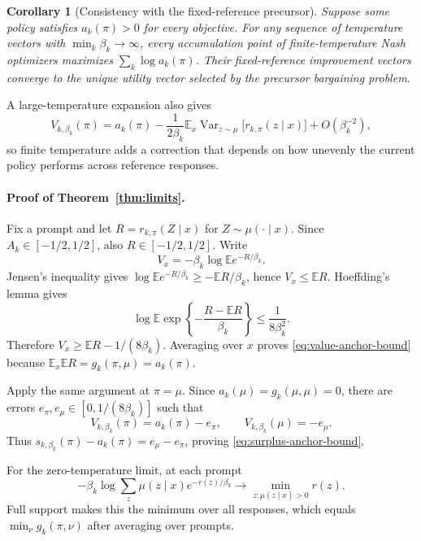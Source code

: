 \documentclass{article}
\newtheorem{corollary}{Corollary}
\theoremstyle{remark}
\theoremstyle{plain}
\newcommand{\E}{\mathbb{E}}
\begin{document}
\begin{corollary}[Consistency with the fixed-reference precursor]
\label{cor:anchor-consistency}
Suppose some policy satisfies $a_k(\pi)>0$ for every objective. For any sequence of temperature vectors with $\min_k\beta_k\to\infty$, every accumulation point of finite-temperature Nash optimizers maximizes $\sum_k\log a_k(\pi)$. Their fixed-reference improvement vectors converge to the unique utility vector selected by the precursor bargaining problem.
\end{corollary}

A large-temperature expansion also gives
\begin{equation}
V_{k,\beta_k}(\pi)
=a_k(\pi)-\frac{1}{2\beta_k}\E_x\operatorname{Var}_{z\sim\mu}
\big[r_{k,\pi}(z\mid x)\big]+O(\beta_k^{-2}),
\label{eq:large-beta-expansion}
\end{equation}
so finite temperature adds a correction that depends on how unevenly the current policy performs across reference responses.

\paragraph{Proof of Theorem~\ref{thm:limits}.}

Fix a prompt and let $R=r_{k,\pi}(Z\mid x)$ for $Z\sim\mu(\cdot\mid x)$. Since $A_k\in[-1/2,1/2]$, also $R\in[-1/2,1/2]$. Write
\[
V_x=-\beta_k\log\E e^{-R/\beta_k}.
\]
Jensen's inequality gives
$\log\E e^{-R/\beta_k}\ge-\E R/\beta_k$, hence $V_x\le\E R$.
Hoeffding's lemma gives
\[
\log\E\exp\left\{-\frac{R-\E R}{\beta_k}\right\}
\le\frac{1}{8\beta_k^2}.
\]
Therefore
$V_x\ge\E R-1/(8\beta_k)$.
Averaging over $x$ proves \eqref{eq:value-anchor-bound} because
$\E_x\E R=g_k(\pi,\mu)=a_k(\pi)$.

Apply the same argument at $\pi=\mu$. Since $a_k(\mu)=g_k(\mu,\mu)=0$, there are errors $e_\pi,e_\mu\in[0,1/(8\beta_k)]$ such that
\[
V_{k,\beta_k}(\pi)=a_k(\pi)-e_\pi,
\qquad
V_{k,\beta_k}(\mu)=-e_\mu.
\]
Thus
$s_{k,\beta_k}(\pi)-a_k(\pi)=e_\mu-e_\pi$, proving \eqref{eq:surplus-anchor-bound}.

For the zero-temperature limit, at each prompt
\[
-\beta_k\log\sum_z\mu(z\mid x)e^{-r(z)/\beta_k}
\longrightarrow
\min_{z:\mu(z\mid x)>0}r(z).
\]
Full support makes this the minimum over all responses, which equals $\min_\nu g_k(\pi,\nu)$ after averaging over prompts.
\end{document}
